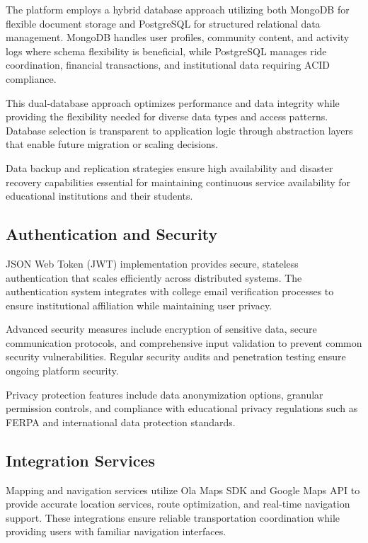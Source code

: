 \documentclass[conference]{IEEEtran}
\begin{document}
The platform employs a hybrid database approach utilizing both MongoDB for flexible document storage and PostgreSQL for structured relational data management. MongoDB handles user profiles, community content, and activity logs where schema flexibility is beneficial, while PostgreSQL manages ride coordination, financial transactions, and institutional data requiring ACID compliance.

This dual-database approach optimizes performance and data integrity while providing the flexibility needed for diverse data types and access patterns. Database selection is transparent to application logic through abstraction layers that enable future migration or scaling decisions.

Data backup and replication strategies ensure high availability and disaster recovery capabilities essential for maintaining continuous service availability for educational institutions and their students.

\subsection{Authentication and Security}

JSON Web Token (JWT) implementation provides secure, stateless authentication that scales efficiently across distributed systems. The authentication system integrates with college email verification processes to ensure institutional affiliation while maintaining user privacy.

Advanced security measures include encryption of sensitive data, secure communication protocols, and comprehensive input validation to prevent common security vulnerabilities. Regular security audits and penetration testing ensure ongoing platform security.

Privacy protection features include data anonymization options, granular permission controls, and compliance with educational privacy regulations such as FERPA and international data protection standards.

\subsection{Integration Services}

Mapping and navigation services utilize Ola Maps SDK and Google Maps API to provide accurate location services, route optimization, and real-time navigation support. These integrations ensure reliable transportation coordination while providing users with familiar navigation interfaces.
\end{document}
